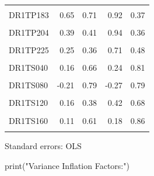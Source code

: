\documentclass[
  letterpaper,
  DIV=11,
  numbers=noendperiod]{scrreport}
\newenvironment{Shaded}{\begin{snugshade}}{\end{snugshade}}
\newcommand{\FunctionTok}[1]{\textcolor[rgb]{0.28,0.35,0.67}{#1}}
\newcommand{\NormalTok}[1]{\textcolor[rgb]{0.00,0.23,0.31}{#1}}
\newcommand{\StringTok}[1]{\textcolor[rgb]{0.13,0.47,0.30}{#1}}
\begin{document}
\begin{table}[!h]
\begin{threeparttable}
\begin{tabular}{lrrrr}
\addlinespace
\cellcolor{gray!6}{DR1TP182} & \cellcolor{gray!6}{6.00} & \cellcolor{gray!6}{6.46} & \cellcolor{gray!6}{0.93} & \cellcolor{gray!6}{0.36}\\
DR1TP183 & 0.65 & 0.71 & 0.92 & 0.37\\
\cellcolor{gray!6}{DR1TP184} & \cellcolor{gray!6}{0.01} & \cellcolor{gray!6}{0.15} & \cellcolor{gray!6}{0.08} & \cellcolor{gray!6}{0.93}\\
DR1TP204 & 0.39 & 0.41 & 0.94 & 0.36\\
\cellcolor{gray!6}{DR1TP205} & \cellcolor{gray!6}{0.40} & \cellcolor{gray!6}{0.34} & \cellcolor{gray!6}{1.18} & \cellcolor{gray!6}{0.25}\\
\addlinespace
DR1TP225 & 0.25 & 0.36 & 0.71 & 0.48\\
\cellcolor{gray!6}{DR1TP226} & \cellcolor{gray!6}{-0.21} & \cellcolor{gray!6}{0.51} & \cellcolor{gray!6}{-0.41} & \cellcolor{gray!6}{0.68}\\
DR1TS040 & 0.16 & 0.66 & 0.24 & 0.81\\
\cellcolor{gray!6}{DR1TS060} & \cellcolor{gray!6}{0.77} & \cellcolor{gray!6}{1.65} & \cellcolor{gray!6}{0.47} & \cellcolor{gray!6}{0.64}\\
DR1TS080 & -0.21 & 0.79 & -0.27 & 0.79\\
\addlinespace
\cellcolor{gray!6}{DR1TS100} & \cellcolor{gray!6}{-0.99} & \cellcolor{gray!6}{1.48} & \cellcolor{gray!6}{-0.67} & \cellcolor{gray!6}{0.51}\\
DR1TS120 & 0.16 & 0.38 & 0.42 & 0.68\\
\cellcolor{gray!6}{DR1TS140} & \cellcolor{gray!6}{-0.00} & \cellcolor{gray!6}{0.97} & \cellcolor{gray!6}{-0.00} & \cellcolor{gray!6}{1.00}\\
DR1TS160 & 0.11 & 0.61 & 0.18 & 0.86\\
\cellcolor{gray!6}{DR1TS180} & \cellcolor{gray!6}{-0.61} & \cellcolor{gray!6}{0.63} & \cellcolor{gray!6}{-0.97} & \cellcolor{gray!6}{0.34}\\
\bottomrule
\end{tabular}
\begin{tablenotes}
\item Standard errors: OLS
\end{tablenotes}
\end{threeparttable}
\end{table}

\begin{Shaded}
\begin{Highlighting}[]
\FunctionTok{print}\NormalTok{(}\StringTok{"Variance Inflation Factors:"}\NormalTok{)}
\end{Highlighting}
\end{Shaded}
\end{document}
